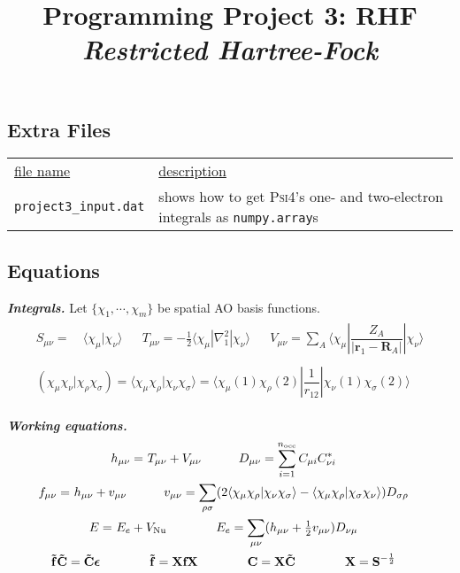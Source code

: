 \documentclass[11pt]{article}
\title{Programming Project 3: RHF\\
\textit{Restricted Hartree-Fock}}
\author{}
\date{}
\newcommand{\linl}[1]{\lstinline{#1}{}}
\newcommand{\ev}{\epsilon}   %
\newcommand{\si}{\sigma}     %
\newcommand{\x}{\chi}        %
\newcommand{\tl}{\ensuremath{\tilde}}
\newcommand{\ul}[1]{\underline{#1}}
\renewcommand{\sp}{\hspace{30pt}}
\newcommand{\cd}{\ensuremath{\cdots}}
\newcommand{\bmit}[1]{{\bfseries\itshape\mathversion{bold}#1}}
\newcommand{\bo}[1]{\ensuremath{\mathbf{#1}}}
\newcommand{\fr}[2]{\ensuremath{\dfrac{#1}{#2}}}
\newcommand{\ip}[1]{\ensuremath{\langle#1\rangle}}
\begin{document}
\maketitle
\vspace{-2cm}

\subsection*{Extra Files}
\begin{tabular}{p{}@{}p{}}
  \ul{file name} & \ul{description} \\
  \linl{project3_input.dat}
  & shows how to get \textsc{Psi4}'s one- and two-electron integrals as \linl{numpy.array}s\\
\end{tabular}


\subsection*{Equations}
\bmit{Integrals.}
Let $\{\x_1,\cd,\x_m\}$ be spatial AO basis functions.
\begin{gather}
\begin{aligned}
\label{oei}
  S_{\mu\nu}
=&\
  \ip{\x_{\mu}|\x_{\nu}}
&&
  T_{\mu\nu}
=
  -\tfrac{1}{2}\ip{\x_{\mu}|\nabla_1^2|\x_{\nu}}
&&
  V_{\mu\nu}
=
  \sum_A\ip{\x_{\mu}|\fr{Z_A}{|\bo{r}_1-\bo{R}_A|}|\x_{\nu}}
\end{aligned}\\
\begin{aligned}
\label{tei}
  (\x_\mu\x_\nu|\x_\rho\x_\si)
=
  \ip{\x_\mu\x_\rho|\x_\nu\x_\si}
=
  \ip{\x_\mu(1)\x_\rho(2)|\fr{1}{r_{12}}|\x_\nu(1)\x_\si(2)}
\end{aligned}
\end{gather}

\noindent
\bmit{Working equations.}
\begin{gather}
\begin{aligned}
\label{core-hamiltonian-and-density}
  h_{\mu\nu}
=&\
  T_{\mu\nu}+V_{\mu\nu}
\sp
  D_{\mu\nu}
=
  \sum_{i=1}^{n_\text{occ}}
  C_{\mu i} C_{\nu i}^*
\end{aligned}\\
\begin{aligned}
\label{fock-matrix}
  f_{\mu\nu}
=&\
  h_{\mu\nu}
+
  v_{\mu\nu}
\sp
  v_{\mu\nu}
=
  \sum_{\rho\si}
  (2\ip{\x_\mu\x_\rho|\x_\nu\x_\si} - \ip{\x_\mu\x_\rho|\x_\si\x_\nu})
  D_{\si\rho}
\end{aligned}\\
\begin{aligned}
\label{energy}
  E
=&\
  E_e
+
  V_\mathrm{Nu}
&&\sp
  E_e
=
  \sum_{\mu\nu}
  (h_{\mu\nu}+\tfrac{1}{2}v_{\mu\nu})D_{\nu\mu}
\end{aligned}\\
\begin{aligned}
\label{orthogonalizer}
&
  \bo{\tl{f}}\bo{\tl{C}}
=
  \bo{\tl{C}}\bm\ev
&&\sp
  \bo{\tl{f}}
=
  \bo{X}\bo{f}\bo{X}
&&\sp
  \bo{C}
=
  \bo{X}
  \bo{\tl{C}}
&&\sp
  \bo{X}
=
  \bo{S}^{-\frac{1}{2}}
\end{aligned}
\end{gather}
\end{document}
